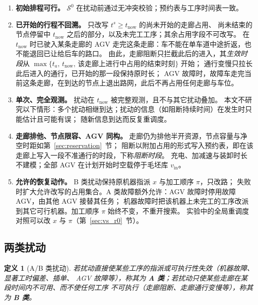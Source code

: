 \documentclass[manuscript,screen,review]{acmart}
\newtheorem{definition}{定义}
\begin{document}
\begin{enumerate}[label=\textbf{A\arabic*.},leftmargin=*,topsep=2pt,itemsep=2pt]
\item \textbf{初始排程可行。} \(\mathcal{S}^0\) 在扰动前通过无冲突校验；预约表与工序时间表一致。
\item \textbf{已开始的行程不回溯。} 只改写 \(t^s\ge t_{\mathrm{now}}\) 的尚未开始的走廊占用、
尚未结束的节点停留中 \(t_{\mathrm{now}}\) 之后的部分，以及未完工工序；其余占用字段不可改写。
在 \(t_{\mathrm{now}}\) 时已驶入某条走廊的 AGV 走完这条走廊：车不能在单车道中途折返，也不能退回已让给后车的路口。
由此，走廊阻断只拦截此后的进入，其\emph{生效时段}从 \(\max\{t_a,\,t_{\mathrm{now}},\,\text{该走廊上进行中占用的结束时刻}\}\) 开始；
通行变慢只拉长此后进入的通行，已开始的那一段保持原时长；
AGV 故障时，故障车走完当前这条走廊，在到达的节点上退出路网，此后不再占用任何走廊与车位。
\item \textbf{单次、完全观测。} 扰动在 \(t_{\mathrm{now}}\) 被完整观测，且不与其它扰动叠加。
本文不研究以下情形：多个扰动相继到达；扰动的信息（如阻断持续时间）在发生时只能估计且可能有误；
随新信息到达而反复重调度。
\item \textbf{走廊排他、节点限容、AGV 同构。} 走廊仍为排他半开资源，节点容量与净空时距如第~\ref{sec:reservation}~节；
阻断以附加占用的形式写入预约表，即在该走廊上写入一段不准通行的时段，下称\emph{阻断时段}。
充电、加减速与装卸时长不建模；全部 AGV 在计划开始时空载停于毛坯库 \(v_{\mathrm{in}}\)。
\item \textbf{允许的恢复动作。} B 类扰动保持原机器指派 \(x\) 与加工顺序 \(\pi\)，只改路；
失败时扩大允许改写的占用集合。A 类故障额外允许：AGV 故障时停用故障 AGV，由其他 AGV 接替其任务；
机器故障时把该机器上未完工的工序改派到其它可行机器。加工顺序 \(\pi\) 始终不变，不重开搜索。
实验中的全局重调度对照可以改 \(x\) 与 \(\pi\)（第~\ref{sec:vs_r0}~节）。
\end{enumerate}

\subsection{两类扰动}
\label{sec:disturbance_classes}

\begin{definition}[A/B 类扰动]
\label{def:ab}
若扰动直接使某些工序的指派或\emph{可执行性}失效（机器故障、显著工时偏差、插单、
AGV 故障等），称其为 \textbf{A 类}；若扰动只使某些走廊在某段时间内不可用、而不使任何工序
不可执行（走廊阻断、走廊通行变慢等），称其为 \textbf{B 类}。
\end{definition}
\end{document}
